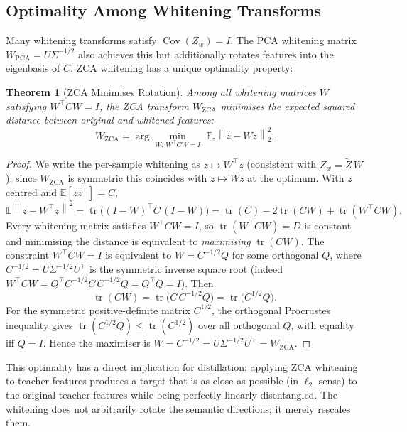 \documentclass[11pt,a4paper]{article}
\newtheorem{theorem}{Theorem}[section]
\newcommand{\E}{\mathbb{E}}
\newcommand{\norm}[1]{\left\|#1\right\|}
\newcommand{\Cov}{\operatorname{Cov}}
\newcommand{\tr}{\operatorname{tr}}
\begin{document}
\subsection{Optimality Among Whitening Transforms}
\label{sec:zca_optimality}

Many whitening transforms satisfy $\Cov(Z_w) = I$.  The PCA whitening matrix
$W_{\mathrm{PCA}} = U \Sigma^{-1/2}$ also achieves this but additionally rotates
features into the eigenbasis of $C$.  ZCA whitening has a unique optimality
property:

\begin{theorem}[ZCA Minimises Rotation]
\label{thm:zca_optimal}
Among all whitening matrices $W$ satisfying $W^\top C W = I$, the ZCA
transform $W_{\mathrm{ZCA}}$ minimises the expected squared distance between
original and whitened features:
\[
    W_{\mathrm{ZCA}} = \arg\min_{W:\,W^\top C W = I}\; \E_z \norm{z - Wz}_2^2.
\]
\end{theorem}
\begin{proof}
We write the per-sample whitening as $z \mapsto W^\top z$ (consistent with
$Z_w = \tilde Z\,W$); since $W_{\mathrm{ZCA}}$ is symmetric this coincides with
$z \mapsto Wz$ at the optimum.  With $z$ centred and $\E[zz^\top] = C$,
\[
    \E\norm{z - W^\top z}^2
    = \tr\!\bigl((I - W)^\top C\,(I - W)\bigr)
    = \tr(C) - 2\tr(CW) + \tr(W^\top C W).
\]
Every whitening matrix satisfies $W^\top C W = I$, so $\tr(W^\top C W) = D$ is
constant and minimising the distance is equivalent to \emph{maximising}
$\tr(CW)$.  The constraint $W^\top C W = I$ is equivalent to $W = C^{-1/2}Q$ for
some orthogonal $Q$, where $C^{-1/2} = U\Sigma^{-1/2}U^\top$ is the symmetric
inverse square root (indeed
$W^\top C W = Q^\top C^{-1/2} C\, C^{-1/2} Q = Q^\top Q = I$).  Then
\[
    \tr(CW) = \tr\!\bigl(C\,C^{-1/2}Q\bigr) = \tr\!\bigl(C^{1/2}Q\bigr).
\]
For the symmetric positive-definite matrix $C^{1/2}$, the orthogonal Procrustes
inequality gives $\tr(C^{1/2}Q) \le \tr(C^{1/2})$ over all orthogonal $Q$, with
equality iff $Q = I$.  Hence the maximiser is
$W = C^{-1/2} = U\Sigma^{-1/2}U^\top = W_{\mathrm{ZCA}}$.
\end{proof}

This optimality has a direct implication for distillation: applying ZCA
whitening to teacher features produces a target that is as close as possible
(in $\ell_2$ sense) to the original teacher features while being perfectly
linearly disentangled.  The whitening does not arbitrarily rotate the semantic
directions; it merely rescales them.
\end{document}
